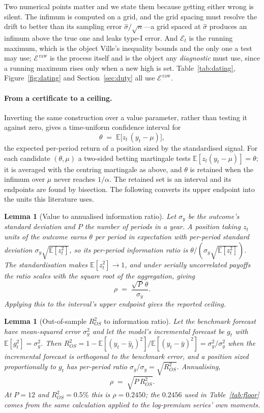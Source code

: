 \documentclass{article}
\theoremstyle{plain}
\newtheorem{lemma}[theorem]{Lemma}
\theoremstyle{definition}
\newcommand{\rsq}{R^2_{OS}}
\begin{document}
Two numerical points matter and we state them because getting either wrong is silent. The
infimum is computed on a grid, and the grid spacing must resolve the drift to better than its
sampling error $\hat\sigma/\sqrt{n}$---a grid spaced at $\hat\sigma$ produces an infimum above
the true one and leaks type-I error. And $\mathcal{E}_t$ is the running maximum, which is the
object Ville's inequality bounds and the only one a test may use; $\mathcal{E}^{\,\mathrm{raw}}$
is the process itself and is the object any \emph{diagnostic} must use, since a running maximum
rises only when a new high is set. Table~\ref{tab:dating}, Figure~\ref{fig:dating} and
Section~\ref{sec:duty} all use $\mathcal{E}^{\,\mathrm{raw}}$.

\paragraph{From a certificate to a ceiling.} Inverting the same construction over a value
parameter, rather than testing it against zero, gives a time-uniform confidence interval for
\[
  \theta \;=\; \mathbb{E}\bigl[z_t\,(y_t-\mu)\bigr],
\]
the expected per-period return of a position sized by the standardised signal. For each
candidate $(\theta,\mu)$ a two-sided betting martingale tests $\mathbb{E}[z_t(y_t-\mu)]=\theta$;
it is averaged with the centring martingale as above, and $\theta$ is retained when the infimum
over $\mu$ never reaches $1/\alpha$. The retained set is an interval and its endpoints are found
by bisection. The following converts its upper endpoint into the units this literature uses.

\begin{lemma}[Value to annualised information ratio]
\label{lem:convert}
Let $\sigma_y$ be the outcome's standard deviation and $P$ the number of periods in a year.
A position taking $z_t$ units of the outcome earns $\theta$ per period in expectation with
per-period standard deviation $\sigma_y\sqrt{\mathbb{E}[z_t^2]}$, so its per-period information
ratio is $\theta/(\sigma_y\sqrt{\mathbb{E}[z_t^2]})$. The standardisation makes
$\mathbb{E}[z_t^2]\to1$, and under serially uncorrelated payoffs the ratio scales with the
square root of the aggregation, giving
\[
  \rho \;=\; \frac{\sqrt{P}\,\theta}{\sigma_y}.
\]
Applying this to the interval's upper endpoint gives the reported ceiling.
\end{lemma}

\begin{lemma}[Out-of-sample $\rsq$ to information ratio]
\label{lem:r2}
Let the benchmark forecast have mean-squared error $\sigma_y^2$ and let the model's incremental
forecast be $g_t$ with $\mathbb{E}[g_t^2]=\sigma_g^2$. Then
$\rsq = 1 - \mathbb{E}[(y_t-\hat y_t)^2]/\mathbb{E}[(y_t-\bar y)^2] = \sigma_g^2/\sigma_y^2$
when the incremental forecast is orthogonal to the benchmark error, and a position sized
proportionally to $g_t$ has per-period ratio $\sigma_g/\sigma_y=\sqrt{\rsq}$. Annualising,
\[
  \rho \;=\; \sqrt{P\,\rsq}.
\]
At $P=12$ and $\rsq=0.5\%$ this is $\rho=0.2450$; the $0.2456$ used in Table~\ref{tab:floor}
comes from the same calculation applied to the log-premium series' own moments.
\end{lemma}
\end{document}
